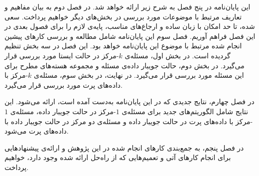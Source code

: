 
این پایان‌نامه در پنج فصل به شرح زیر ارائه خواهد شد.
در فصل دوم به بیان مفاهیم و تعاریف مرتبط با موضوعات مورد بررسی در بخش‌های دیگر خواهیم پرداخت. سعی شده، تا حد امکان با زبان ساده و ارجاع‌های مناسب، پایه‌ی لازم را برای فصول بعدی در این فصل فراهم آوریم.
فصل سوم این پایان‌نامه شامل مطالعه و بررسی کارهای پیشین انجام شده مرتبط با موضوع این پایان‌نامه خواهد بود.
این فصل در سه بخش تنظیم گردیده است.
در بخش اول، مسئله‌ی $k$-مرکز در حالت ایستا مورد بررسی قرار می‌گیرد.
در بخش دوم، حالت جویبار داده‌ی مسئله و مجموعه هسته‌های مطرح برای این مسئله مورد بررسی قرار می‌گیرد. در نهایت، در بخش سوم، مسئله‌ی $k$-مرکز با داده‌های پرت مورد بررسی قرار می‌گیرد.

در فصل چهارم، نتایج جدیدی که در این پایان‌نامه به‌دست آمده است، ارائه می‌شود.
این نتایج شامل الگوریتم‌های جدید برای مسئله‌ی $1$-مرکز در حالت جویبار داده، مسئله‌ی $1$-مرکز با داده‌های پرت در حالت جویبار داده و مسئله‌ی دو مرکز در حالت جویبار داده با داده‌های پرت می‌شود.

در فصل پنجم، به جمع‌بندی کارهای انجام شده در این پژوهش و ارائه‌ی پیشنهادهایی برای انجام کارهای آتی و تعمیم‌هایی که از راه‌حل ارائه شده وجود دارد، خواهیم پرداخت.